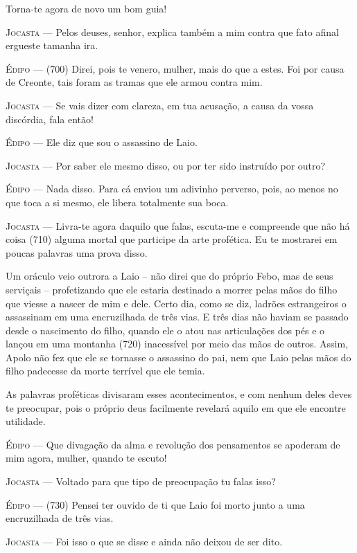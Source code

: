 Torna-te agora de novo um bom guia!

\textsc{Jocasta} --- Pelos deuses, senhor, explica também a mim contra que fato afinal
ergueste tamanha ira.

\textsc{Édipo} --- (700) Direi, pois te venero, mulher, mais do que a estes. Foi por causa
de Creonte, tais foram as tramas que ele armou contra mim.

\textsc{Jocasta} --- Se vais dizer com clareza, em tua acusação, a causa da vossa discórdia,
fala então!

\textsc{Édipo} --- Ele diz que sou o assassino de Laio.

\textsc{Jocasta} --- Por saber ele mesmo disso, ou por ter sido instruído por outro?

\textsc{Édipo} --- Nada disso. Para cá enviou um adivinho perverso, pois, ao menos no que
toca a si mesmo, ele libera totalmente sua boca.

\textsc{Jocasta} --- Livra-te agora daquilo que falas, escuta-me e compreende que não há
coisa (710) alguma mortal que participe da arte profética. Eu te
mostrarei em poucas palavras uma prova disso.

Um oráculo veio outrora a Laio -- não direi que do próprio Febo, mas de
seus serviçais -- profetizando que ele estaria destinado a morrer pelas
mãos do filho que viesse a nascer de mim e dele. Certo dia, como se diz,
ladrões estrangeiros o assassinam em uma encruzilhada de três vias. E
três dias não haviam se passado desde o nascimento do filho, quando ele
o atou nas articulações dos pés e o lançou em uma montanha (720)
inacessível por meio das mãos de outros. Assim, Apolo não fez que ele se
tornasse o assassino do pai, nem que Laio pelas mãos do filho padecesse
da morte terrível que ele temia.

As palavras proféticas divisaram esses acontecimentos, e com nenhum
deles deves te preocupar, pois o próprio deus facilmente revelará aquilo
em que ele encontre utilidade.

\textsc{Édipo} --- Que divagação da alma e revolução dos pensamentos se apoderam de mim
agora, mulher, quando te escuto!

\textsc{Jocasta} --- Voltado para que tipo de preocupação tu falas isso?

\textsc{Édipo} --- (730) Pensei ter ouvido de ti que Laio foi morto junto a uma
encruzilhada de três vias.

\textsc{Jocasta} --- Foi isso o que se disse e ainda não deixou de ser dito.

